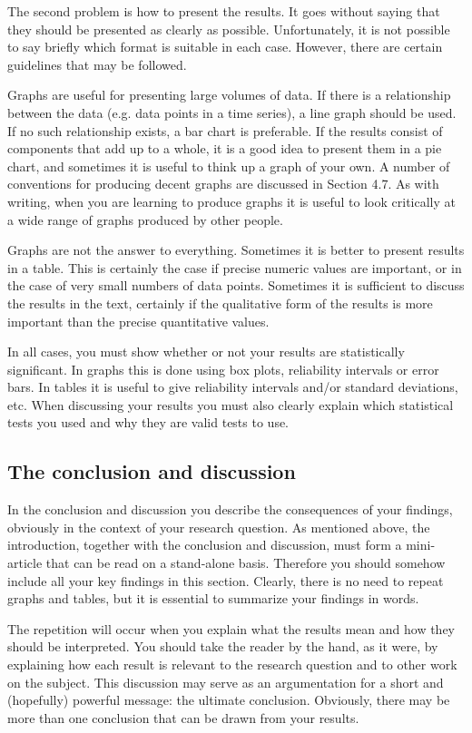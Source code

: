 The second problem is how to present the results. It goes without saying that they should be presented as clearly as possible. Unfortunately, it is not possible to say briefly which format is suitable in each case. However, there are certain guidelines that may be followed.

Graphs are useful for presenting large volumes of data. If there is a relationship between the data (e.g. data points in a time series), a line graph should be used. If no such relationship exists, a bar chart is preferable. If the results consist of components that add up to a whole, it is a good idea to present them in a pie chart, and sometimes it is useful to think up a graph of your own. A number of conventions for producing decent graphs are discussed in Section 4.7. As with writing, when you are learning to produce graphs it is useful to look critically at a wide range of graphs produced by other people.

Graphs are not the answer to everything. Sometimes it is better to present results in a table. This is certainly the case if precise numeric values are important, or in the case of very small numbers of data points. Sometimes it is sufficient to discuss the results in the text, certainly if the qualitative form of the results is more important than the precise quantitative values.

In all cases, you must show whether or not your results are statistically significant. In graphs this is done using box plots, reliability intervals or error bars. In tables it is useful to give reliability intervals and/or standard deviations, etc. When discussing your results you must also clearly explain which statistical tests you used and why they are valid tests to use.

\subsection{The conclusion and discussion}\label{sec:_conclusion_discussion}
In the conclusion and discussion you describe the consequences of your findings, obviously in the context of your research question. As mentioned above, the introduction, together with the conclusion and discussion, must form a mini-article that can be read on a stand-alone basis. Therefore you should somehow include all your key findings in this section. Clearly, there is no need to repeat graphs and tables, but it is essential to summarize your findings in words.

The repetition will occur when you explain what the results mean and how they should be interpreted. You should take the reader by the hand, as it were, by explaining  how each result is relevant to the research question and to other work on the subject.  This discussion may serve as an argumentation for a short and (hopefully) powerful message: the ultimate conclusion. Obviously, there may be more than one conclusion that can be drawn from your results.


